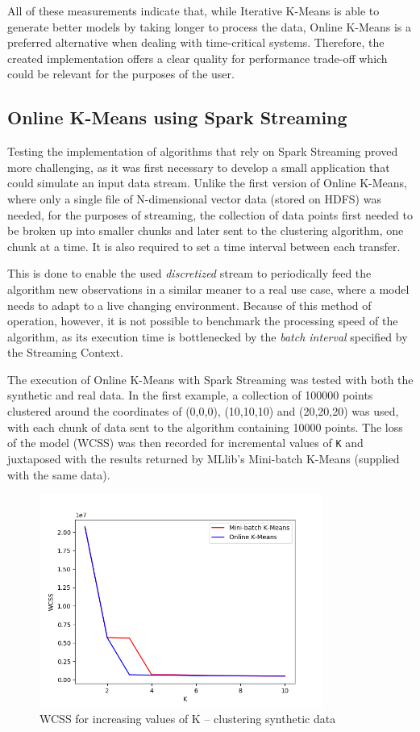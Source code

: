 \documentclass{l4proj}
\begin{document}
All of these measurements indicate that, while Iterative K-Means is able to generate better models by taking longer to process the data, Online K-Means is a preferred alternative when dealing with time-critical systems. Therefore, the created implementation offers a clear quality for performance trade-off which could be relevant for the purposes of the user.

\subsection{Online K-Means using Spark Streaming}

Testing the implementation of algorithms that rely on Spark Streaming proved more challenging, as it was first necessary to develop a small application that could simulate an input data stream. Unlike the first version of Online K-Means, where only a single file of N-dimensional vector data (stored on HDFS) was needed, for the purposes of streaming, the collection of data points first needed to be broken up into smaller chunks and later sent to the clustering algorithm, one chunk at a time. It is also required to set a time interval between each transfer.

This is done to enable the used \textit{discretized} stream to periodically feed the algorithm new observations in a similar meaner to a real use case, where a model needs to adapt to a live changing environment. Because of this method of operation, however, it is not possible to benchmark the processing speed of the algorithm, as its execution time is bottlenecked by the \textit{batch interval} specified by the Streaming Context.
 
The execution of Online K-Means with Spark Streaming was tested with both the synthetic and real data. In the first example, a collection of 100000 points clustered around the coordinates of (0,0,0), (10,10,10) and (20,20,20) was used, with each chunk of data sent to the algorithm containing 10000 points. The loss of the model (WCSS) was then recorded for incremental values of \texttt{K} and juxtaposed with the results returned by MLlib's Mini-batch K-Means (supplied with the same data).

\begin{figure}[H]
	\centering
    \includegraphics[width=0.83\textwidth]{images/result10}
    \caption{WCSS for increasing values of K -- clustering synthetic data} 
    \label{fig:res10}
\end{figure}
\end{document}
